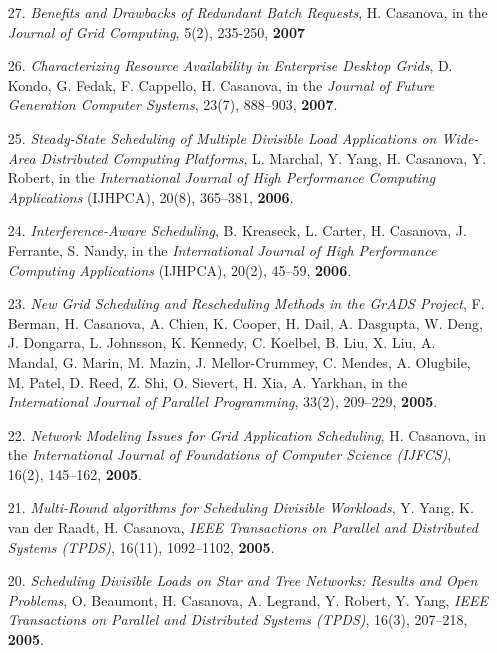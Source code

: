 \begin{enumerate}
\item[27.] {\it Benefits and Drawbacks of Redundant Batch Requests}, H. Casanova, in the \emph{Journal of Grid Computing}, 5(2), 235-250, {\bf 2007}

\item[26.] {\it Characterizing Resource Availability in Enterprise Desktop
Grids}, D. Kondo, G. Fedak, F. Cappello, H. Casanova, in the \emph{Journal
of Future Generation Computer Systems}, 23(7), 888--903, {\bf 2007}.

\item[25.] {\it Steady-State Scheduling of Multiple Divisible Load
Applications on Wide-Area Distributed Computing Platforms}, L. Marchal, Y.
Yang, H. Casanova, Y. Robert, in the \emph{International Journal
of High Performance Computing Applications} (IJHPCA), 20(8), 365--381,
{\bf 2006}.

\item [24.] {\it Interference-Aware Scheduling}, B. Kreaseck,
L. Carter, H. Casanova, J. Ferrante, S. Nandy, 
in the \emph{International Journal of High Performance Computing
Applications} (IJHPCA), 20(2), 45--59, {\bf 2006}.

\item [23.]
{\it New Grid Scheduling and Rescheduling Methods in the GrADS Project},
F. Berman, H. Casanova, A. Chien, K. Cooper, H. Dail, A. Dasgupta, W. Deng, J. Dongarra, L. Johnsson, K. Kennedy, C. Koelbel, B. Liu, X. Liu, A. Mandal, G. Marin, M. Mazin, J. Mellor-Crummey, C. Mendes, A. Olugbile, M. Patel, D. Reed, Z. Shi, O. Sievert, H. Xia, A. Yarkhan, in the \emph{International Journal of Parallel Programming}, 33(2), 209--229, {\bf 2005}. 

\item [22.]
{\it Network Modeling Issues for Grid Application Scheduling}, 
H. Casanova, in the \emph{International Journal of 
Foundations of Computer Science (IJFCS)}, 16(2), 145--162, {\bf 2005}.

\item [21.] 
{\it Multi-Round algorithms for Scheduling Divisible Workloads},
Y. Yang, K. van der Raadt, H. Casanova, \emph{IEEE Transactions on
Parallel and Distributed Systems (TPDS)}, 16(11), 1092--1102, {\bf 2005}.

\item [20.]
{\it Scheduling Divisible Loads on Star and Tree Networks: Results
and Open Problems}, O. Beaumont, H. Casanova, A. Legrand, Y. Robert,
Y. Yang, \emph{IEEE Transactions on Parallel and Distributed
Systems (TPDS)}, 16(3), 207--218, {\bf 2005}.


\end{enumerate}
